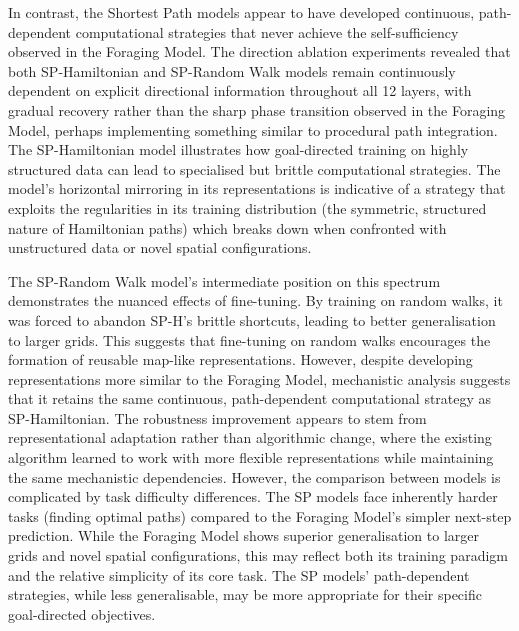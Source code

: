 In contrast, the Shortest Path models appear to have developed continuous, path-dependent computational strategies that never achieve the self-sufficiency observed in the Foraging Model. The direction ablation experiments revealed that both SP-Hamiltonian and SP-Random Walk models remain continuously dependent on explicit directional information throughout all 12 layers, with gradual recovery rather than the sharp phase transition observed in the Foraging Model, perhaps implementing something similar to procedural path integration. The SP-Hamiltonian model illustrates how goal-directed training on highly structured data can lead to specialised but brittle computational strategies. The model's horizontal mirroring in its representations is indicative of a strategy that exploits the regularities in its training distribution (the symmetric, structured nature of Hamiltonian paths) which breaks down when confronted with unstructured data or novel spatial configurations. 

The SP-Random Walk model's intermediate position on this spectrum demonstrates the nuanced effects of fine-tuning. By training on random walks, it was forced to abandon SP-H's brittle shortcuts, leading to better generalisation to larger grids. This suggests that fine-tuning on
random walks encourages the formation of reusable map-like representations. However, despite developing representations more similar to the Foraging Model, mechanistic analysis suggests that it retains the same continuous, path-dependent computational strategy as SP-Hamiltonian. The robustness improvement appears to stem from representational adaptation rather than algorithmic change, where the existing algorithm learned to work with more flexible representations while maintaining the same mechanistic dependencies.  However, the comparison between models is complicated by task difficulty differences. The SP models face inherently harder tasks (finding optimal paths) compared to the Foraging Model's simpler next-step prediction. While the Foraging Model shows superior generalisation to larger grids and novel spatial configurations, this may reflect both its training paradigm and the relative simplicity of its core task. The SP models' path-dependent strategies, while less generalisable, may be more appropriate for their specific goal-directed objectives. 




